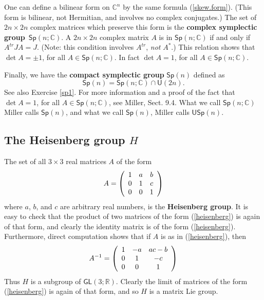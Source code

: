\documentclass{amsbook}
\theoremstyle{plain}
\numberwithin{equation}{chapter}
\numberwithin{theorem}{chapter}
\begin{document}
One can define a bilinear form on $\mathbb{C}^{n}$ by the same formula
(\ref{skew.form}). (This form is bilinear, not Hermitian, and involves no
complex conjugates.) The set of $2n\times2n$ complex matrices which preserve
this form is the \textbf{complex symplectic group}\emph{\ }$\mathsf{Sp}%
(n;\mathbb{C})$. A $2n\times2n$ complex matrix $A$ is in $\mathsf{Sp}%
(n;\mathbb{C})$ if and only if $A^{tr}JA=J$. (Note: this condition involves
$A^{tr}$, \textit{not} $A^{\ast}$.) This relation shows that $\det A=\pm1$,
for all $A\in\mathsf{Sp}(n;\mathbb{C})$. In fact $\det A=1$, for all
$A\in\mathsf{Sp}(n;\mathbb{C})$.

Finally, we have the \textbf{compact symplectic group} $\mathsf{Sp}(n)$
defined as
\[
\mathsf{Sp}(n)=\mathsf{Sp}\left(  n;\mathbb{C}\right)  \cap\mathsf{U}(2n).
\]
See also Exercise \ref{sp1}. For more information and a proof of the fact that
$\det A=1$, for all $A\in\mathsf{Sp}(n;\mathbb{C})$, see Miller, Sect. 9.4.
What we call $\mathsf{Sp}\left(  n;\mathbb{C}\right)  $ Miller calls
$\mathsf{Sp}(n)$, and what we call $\mathsf{Sp}(n)$, Miller calls
$\mathsf{USp}(n)$.

\subsection{The Heisenberg group $H$}

The set of all $3\times3$ real matrices $A$ of the form
\begin{equation}
A=\left(
\begin{array}
[c]{ccc}%
1 & a & b\\
0 & 1 & c\\
0 & 0 & 1
\end{array}
\right) \label{heisenberg}%
\end{equation}
where $a$, $b$, and $c$ are arbitrary real numbers, is the \textbf{Heisenberg
group}. It is easy to check that the product of two matrices of the form
(\ref{heisenberg}) is again of that form, and clearly the identity matrix is
of the form (\ref{heisenberg}). Furthermore, direct computation shows that if
$A$ is as in (\ref{heisenberg}), then
\[
A^{-1}=\left(
\begin{array}
[c]{ccc}%
1 & -a & ac-b\\
0 & 1 & -c\\
0 & 0 & 1
\end{array}
\right)
\]
Thus $H$ is a subgroup of $\mathsf{GL}(3;\mathbb{R})$. Clearly the limit of
matrices of the form (\ref{heisenberg}) is again of that form, and so $H$ is a
matrix Lie group.
\end{document}
